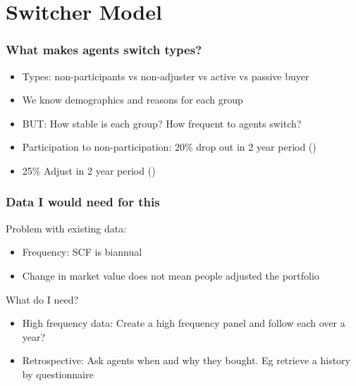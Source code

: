 \documentclass[pdflatex]{beamer}
\begin{document}
\section{Switcher Model}
\begin{frame}
	\frametitle{What makes agents switch types?}
	\begin{itemize}
		\item Types: non-participants vs non-adjuster vs active vs passive buyer
		\item We know demographics and reasons for each group
		\item BUT: How stable is each group? How frequent to agents switch?
		\item Participation to non-participation: 20\% drop out in 2 year period (\cite{B2021_HouseholdStockMarket})
		\item 25\% Adjust in 2 year period (\cite{BCZ2012_ConsumptionSmoothingPortfolio})
	\end{itemize}
\end{frame}

\begin{frame}
	\frametitle{Data I would need for this}
	Problem with existing data: 
	\begin{itemize}
		\item Frequency: SCF is biannual
		\item Change in market value does not mean people adjusted the portfolio
	\end{itemize}
\vspace{2em}
	What do I need?
	\begin{itemize}
		\item High frequency data: Create a high frequency panel and follow each over a year?
		\item Retrospective: Ask agents when and why they bought. Eg retrieve a history by questionnaire
	\end{itemize}
\end{frame}

\end{document}
